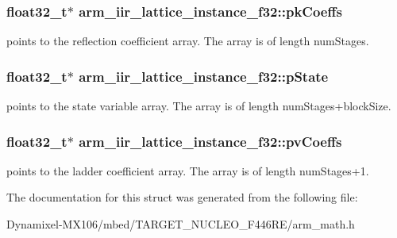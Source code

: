 \subsubsection[{\texorpdfstring{pk\+Coeffs}{pkCoeffs}}]{\setlength{\rightskip}{0pt plus 5cm}float32\+\_\+t$\ast$ arm\+\_\+iir\+\_\+lattice\+\_\+instance\+\_\+f32\+::pk\+Coeffs}\hypertarget{structarm__iir__lattice__instance__f32_aa69fcdd3775e828d450ce1bbd978fa31}{}\label{structarm__iir__lattice__instance__f32_aa69fcdd3775e828d450ce1bbd978fa31}
points to the reflection coefficient array. The array is of length num\+Stages. 
\subsubsection[{\texorpdfstring{p\+State}{pState}}]{\setlength{\rightskip}{0pt plus 5cm}float32\+\_\+t$\ast$ arm\+\_\+iir\+\_\+lattice\+\_\+instance\+\_\+f32\+::p\+State}\hypertarget{structarm__iir__lattice__instance__f32_a30babe7815510219e6e3d28e6e4a5969}{}\label{structarm__iir__lattice__instance__f32_a30babe7815510219e6e3d28e6e4a5969}
points to the state variable array. The array is of length num\+Stages+block\+Size. 
\subsubsection[{\texorpdfstring{pv\+Coeffs}{pvCoeffs}}]{\setlength{\rightskip}{0pt plus 5cm}float32\+\_\+t$\ast$ arm\+\_\+iir\+\_\+lattice\+\_\+instance\+\_\+f32\+::pv\+Coeffs}\hypertarget{structarm__iir__lattice__instance__f32_afc7c8f577e6f27d097fe55f57e707f72}{}\label{structarm__iir__lattice__instance__f32_afc7c8f577e6f27d097fe55f57e707f72}
points to the ladder coefficient array. The array is of length num\+Stages+1. 

The documentation for this struct was generated from the following file\+:\begin{DoxyCompactItemize}
\item 
Dynamixel-\/\+M\+X106/mbed/\+T\+A\+R\+G\+E\+T\+\_\+\+N\+U\+C\+L\+E\+O\+\_\+\+F446\+R\+E/arm\+\_\+math.\+h\end{DoxyCompactItemize}
